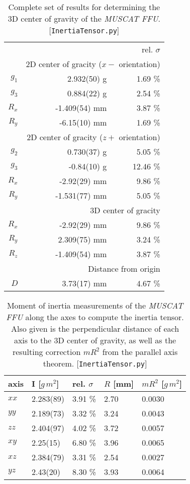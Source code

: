 \documentclass[journal]{IEEEtran}
\begin{document}
\begin{table}
	\centering
	\begin{tabular}{r | r r}
		\multicolumn{3}{r}{rel. $\sigma$} \\
		& \multicolumn{2}{r}{2D center of gracity ($x-$ orientation)} \\
		\hline
		$g_{1}$	& 2.932(50) g	& 1.69 \% \\
		$g_{3}$	& 0.884(22) g	& 2.54 \% \\
		$R_x$	& -1.409(54) mm	& 3.87 \% \\
		$R_y$	& -6.15(10) mm	& 1.69 \% \\
		& \multicolumn{2}{r}{2D center of gracity ($z+$ orientation)} \\
		\hline
		$g_2$	& 0.730(37) g	& 5.05 \% \\
		$g_3$	& -0.84(10) g	& 12.46 \% \\
		$R_x$	& -2.92(29) mm	& 9.86 \% \\
		$R_y$	& -1.531(77) mm	& 5.05 \% \\
		& \multicolumn{2}{r}{3D center of gracity} \\
		\hline
		$R_x$	& -2.92(29) mm	& 9.86 \% \\
		$R_y$	& 2.309(75) mm	& 3.24 \% \\
		$R_z$	& -1.409(54) mm	& 3.87 \% \\
		& \multicolumn{2}{r}{Distance from origin} \\
		\hline
		$D$	& 3.73(17) mm	& 4.67 \% \\
	\end{tabular}
	\caption{Complete set of results for determining the 3D center of gravity of the \emph{MUSCAT FFU}. [\texttt{InertiaTensor.py}]}
	\label{tab:FFUCoG}
\end{table}

\begin{table}
	\centering
	\begin{tabular}{l | l l l l}
		axis	& I [$\unit{g\,m^2}$]		& rel. $\sigma$ & $R$ [mm]		& $m R^2$ [$\unit{g\,m^2}$] \\
		\hline
		$xx$	& 2.283(89) & 3.91 \%	& 2.70	& 0.0030 \\
		$yy$	& 2.189(73) & 3.32 \% 	& 3.24	& 0.0043 \\
		$zz$	& 2.404(97) & 4.02 \% 	& 3.72	& 0.0057 \\
		$xy$	& 2.25(15) & 6.80 \% 	& 3.96	& 0.0065 \\
		$xz$	& 2.384(79) & 3.31 \%	& 2.54	& 0.0027 \\
		$yz$	& 2.43(20) & 8.30 \%	& 3.93	& 0.0064 \\
	\end{tabular}
	\caption{Moment of inertia measurements of the \emph{MUSCAT FFU} along the axes to compute the inertia tensor. Also given is the perpendicular distance of each axis to the 3D center of gravity, as well as the resulting correction $mR^2$ from the parallel axis theorem. [\texttt{InertiaTensor.py}]}
	\label{tab:FFUI}
\end{table}
\end{document}
